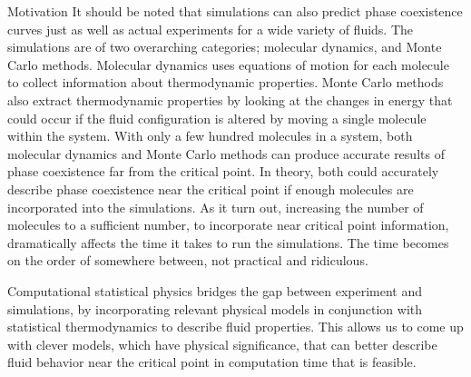 \begin{section}{Motivation}
It should be noted that simulations can also predict phase coexistence curves just as well as actual experiments for a wide variety of fluids.  The simulations are of two overarching categories; molecular dynamics, and Monte Carlo methods.  Molecular dynamics uses equations of motion for each molecule to collect information about thermodynamic properties.  Monte Carlo methods also extract thermodynamic properties by looking at the changes in energy that could occur if the fluid configuration is altered by moving a single molecule within the system.  With only a few hundred molecules in a system, both molecular dynamics and Monte Carlo methods can produce accurate results of phase coexistence far from the critical point.  In theory, both could accurately describe phase coexistence near the critical point if enough molecules are incorporated into the simulations.  As it turn out, increasing the number of molecules to a sufficient number, to incorporate near critical point information, dramatically affects the time it takes to run the simulations.  The time becomes on the order of somewhere between, not practical and ridiculous.

Computational statistical physics bridges the gap between experiment and simulations, by incorporating relevant physical models in conjunction with statistical thermodynamics to describe fluid properties.  This allows us to come up with clever models, which have physical significance, that can better describe fluid behavior near the critical point in computation time that is feasible.            


\end{section}




